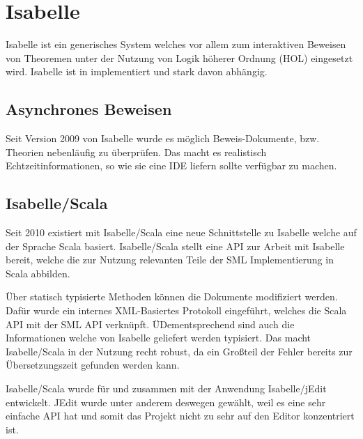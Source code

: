 \section{Isabelle}

Isabelle ist ein generisches System welches vor allem zum interaktiven Beweisen von Theoremen unter
der Nutzung von Logik höherer Ordnung (HOL) eingesetzt wird. Isabelle ist in  implementiert
und stark davon abhängig. \cite{isabelle}

\subsection{Asynchrones Beweisen}

Seit Version 2009 von Isabelle wurde es möglich Beweis-Dokumente, bzw. Theorien nebenläufig zu
überprüfen. Das macht es realistisch Echtzeitinformationen, so wie sie eine IDE liefern sollte
verfügbar zu machen.

\subsection{Isabelle/Scala}

Seit 2010 existiert mit Isabelle/Scala eine neue Schnittstelle zu Isabelle welche auf der Sprache
Scala basiert. Isabelle/Scala stellt eine API zur Arbeit mit Isabelle bereit, welche die zur Nutzung
relevanten Teile der SML Implementierung in Scala abbilden. \cite{iscala}

Über statisch typisierte Methoden können die Dokumente modifiziert werden. Dafür wurde ein internes
XML-Basiertes Protokoll eingeführt, welches die Scala API mit der SML API verknüpft.
ÜDementsprechend sind auch die Informationen welche von Isabelle geliefert werden typisiert. Das
macht Isabelle/Scala in der Nutzung recht robust, da ein Großteil der Fehler bereits zur
Übersetzungszeit gefunden werden kann.

Isabelle/Scala wurde für und zusammen mit der Anwendung Isabelle/jEdit entwickelt. JEdit wurde unter
anderem deswegen gewählt, weil es eine sehr einfache API hat und somit das Projekt nicht zu sehr auf
den Editor konzentriert ist.
